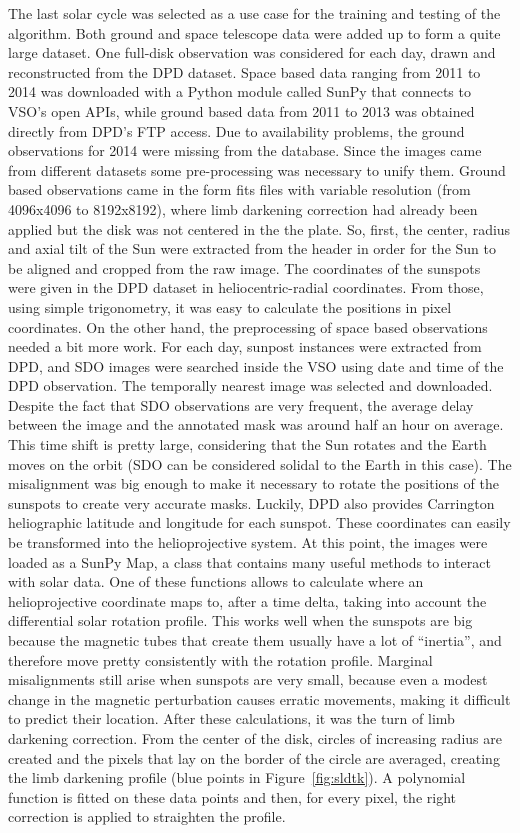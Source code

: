 The last solar cycle was selected as a use case for the training and testing of the algorithm. Both ground and space telescope data were added up to form a quite large dataset. One full-disk observation was considered for each day, drawn and reconstructed from the DPD dataset. Space based data ranging from 2011 to 2014 was downloaded with a Python module called SunPy \cite{mumford2015sunpy} that connects to VSO's open APIs, while ground based data from 2011 to 2013 was obtained directly from DPD's FTP access. Due to availability problems, the ground observations for 2014 were missing from the database. Since the images came from different datasets some pre-processing was necessary to unify them. Ground based observations came in the form fits files with variable resolution (from 4096x4096 to 8192x8192), where limb darkening correction had already been applied but the disk was not centered in the the plate. So, first, the center, radius and axial tilt of the Sun were extracted from the header in order for the Sun to be aligned and cropped from the raw image. The coordinates of the sunspots were given in the DPD dataset in heliocentric-radial coordinates. From those, using simple trigonometry, it was easy to calculate the positions in pixel coordinates.
On the other hand, the preprocessing of space based observations needed a bit more work. For each day, sunpost instances were extracted from DPD, and SDO images were searched inside the VSO using date and time of the DPD observation. The temporally nearest image was selected and downloaded. Despite the fact that SDO observations are very frequent, the average delay between the image and the annotated mask was around half an hour on average. This time shift is pretty large, considering that the Sun rotates and the Earth moves on the orbit (SDO can be considered solidal to the Earth in this case). The misalignment was big enough to make it necessary to rotate the positions of the sunspots to create very accurate masks. Luckily, DPD also provides Carrington heliographic latitude and longitude for each sunspot. These coordinates can easily be transformed into the helioprojective system. At this point, the images were loaded as a SunPy Map, a class that contains many useful methods to interact with solar data. One of these functions allows to calculate where an helioprojective coordinate maps to, after a time delta, taking into account the differential solar rotation profile. This works well when the sunspots are big because the magnetic tubes that create them usually have a lot of ``inertia'', and therefore move pretty consistently with the rotation profile. Marginal misalignments still arise when sunspots are very small, because even a modest change in the magnetic perturbation causes erratic movements, making it difficult to predict their location. After these calculations, it was the turn of limb darkening correction. From the center of the disk, circles of increasing radius are created and the pixels that lay on the border of the circle are averaged, creating the limb darkening profile (blue points in Figure~\ref{fig:sldtk}). A polynomial function is fitted on these data points and then, for every pixel, the right correction is applied to straighten the profile.
